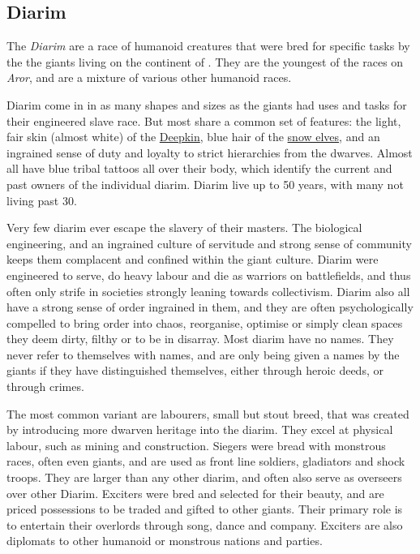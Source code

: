 \subsection{Diarim}
\label{sec:Diarim}


The \emph{Diarim} are a race of humanoid creatures that were bred for specific
tasks by the the giants living on the continent of . They
are the youngest of the races on \emph{Aror}, and are a mixture of various
other humanoid races.

Diarim come in in as many shapes and sizes as the giants had uses and tasks
for their engineered slave race. But most share a common set of features: the
light, fair skin (almost white) of the \hyperref[sec:Deepkin]{Deepkin}, blue
hair of the \hyperref[sec:Snow Elves]{snow elves}, and an ingrained sense of
duty and loyalty to strict hierarchies from the dwarves. Almost all have blue
tribal tattoos all over their body, which identify the current and past owners
of the individual diarim. Diarim live up to 50 years, with many not living
past 30.

Very few diarim ever escape the slavery of their masters. The biological
engineering, and an ingrained culture of servitude and strong sense of
community keeps them complacent and confined within the giant culture. Diarim
were engineered to serve, do heavy labour and die as warriors on battlefields,
and thus often only strife in societies strongly leaning towards
collectivism. Diarim also all have a strong sense of order ingrained in them,
and they are often psychologically compelled to bring order into chaos,
reorganise, optimise or simply clean spaces they deem dirty, filthy or to be
in disarray. Most diarim have no names. They never refer to themselves with
names, and are only being given a names by the giants if they have
distinguished themselves, either through heroic deeds, or through crimes.

The most common variant are labourers, small but stout breed, that was created
by introducing more dwarven heritage into the diarim. They excel at physical
labour, such as mining and construction. Siegers were bread with monstrous
races, often even giants, and are used as front line soldiers, gladiators and
shock troops. They are larger than any other diarim, and often also serve as
overseers over other Diarim. Exciters were bred and selected for their beauty,
and are priced possessions to be traded and gifted to other giants. Their
primary role is to entertain their overlords through song, dance and company.
Exciters are also diplomats to other humanoid or monstrous nations and parties.


